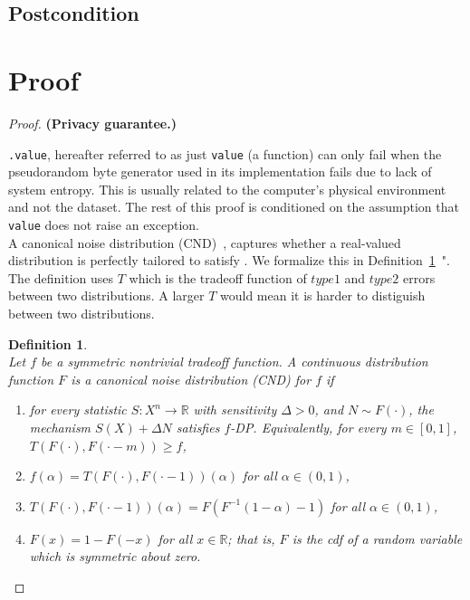\documentclass{article}
\newtheorem{defn}{Definition}
\begin{document}


\subsection*{Postcondition}


\section{Proof}

\begin{proof} 
\textbf{(Privacy guarantee.)} 

\texttt{.value}, hereafter referred to as just \texttt{value} (a function) 
can only fail when the pseudorandom byte generator used in its implementation fails due to lack of system entropy. 
This is usually related to the computer's physical environment and not the dataset. 
The rest of this proof is conditioned on the assumption that \texttt{value} does not raise an exception. \\

A canonical noise distribution (CND)~\parencite{awan2023canonical}, 
captures whether a real-valued distribution is perfectly tailored to satisfy . 
We formalize this in Definition~\ref{def2}~\parencite{awan2023canonical}". The definition uses $T$ which is the tradeoff function of $type 1$ and $type 2$ errors between two distributions. A larger $T$ would mean it is harder to distiguish between two distributions.  
\begin{defn}\label{def2}  %
    \cite[Definition~3.1]{awan2023canonical} \\
    Let $f$ be a symmetric nontrivial tradeoff function. A {continuous} distribution function $F$ is a \emph{canonical noise distribution} (CND) for $f$ if 
    \begin{enumerate}[(1)]
        \item for every statistic $S: X^n\rightarrow \mathbb{R}$ with sensitivity $\Delta>0$, and $N\sim F(\cdot)$, 
            the mechanism $S(X) + \Delta N$ satisfies $f$-DP. Equivalently, for every $m\in [0,1]$, $T(F(\cdot),F(\cdot-m))\geq f$,
        \item $f(\alpha)=T(F(\cdot),F(\cdot-1))(\alpha)$ for all $\alpha \in (0,1)$,
        \item $T(F(\cdot),F(\cdot-1))(\alpha) = F(F^{-1}(1-\alpha)-1)$ for all $\alpha \in (0,1)$,
        \item $F(x) = 1-F(-x)$ for all $x\in \mathbb{R}$; that is, $F$ is the cdf of a random variable which is symmetric about zero.
    \end{enumerate}
\end{defn}


\end{proof}
\end{document}
